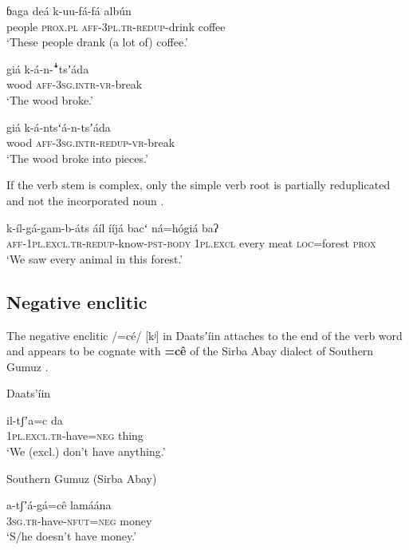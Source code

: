 \documentclass[output=paper]{langsci/langscibook}
\begin{document}
\ea\label{ex:ahlandc:37}
\gll
ɓaga  deá  k-uu-fá-fá   alb\'{u}n   \\
people  \textsc{prox.pl}  \textsc{aff-3pl.tr-redup}{}-drink   coffee \\
\glt
‘These people drank (a lot of) coffee.’ 
\z

\ea\label{ex:ahlandc:38}
\gll
giá     k-á-n-\textsf{ꜜ}tsʼáda \\
wood \textsc{aff-3sg.intr}{}-\textsc{vr-}break \\
\glt
‘The wood broke.’
\z

\ea\label{ex:ahlandc:39}
\gll
giá       k-á-ntsʻá-n-tsʼáda  \\
wood  \textsc{aff-3sg.intr}{}-\textsc{redup}{}-\textsc{vr}{}-break \\
\glt
 ‘The wood broke into pieces.’
\z

If the verb stem is complex, only the simple verb root is partially reduplicated and not the incorporated noun . 

\ea\label{ex:ahlandc:40}
\gll
k-íl-gá-gam-b-áts                                        áíl           ííjá      bacʻ   ná=h\'{o}giá  baʔ \\
\textsc{aff-1pl.excl.tr-redup}{}-know-\textsc{pst-body} \textsc{1pl.excl} every  meat  \textsc{loc}=forest \textsc{prox} \\
\glt
‘We saw every animal in this forest.’
\z


\subsection{Negative enclitic}\label{sec:ahlandc:4.8}

The negative enclitic /=cé/ [kʲ] in Daatsʼíin  attaches to the end of the verb word and appears to be cognate with \textbf{=c\^{e}} of the Sirba Abay dialect of Southern Gumuz  \citep[cf.][241-242]{Ahland2012}. 

\ea\label{ex:ahlandc:41}
Daats’íin

\gll
il-tʃʼa=c   da \\
\textsc{  1pl.excl.tr}{}-have=\textsc{neg}     thing \\
\glt
  ‘We (excl.) don’t have anything.’
\z

\ea\label{ex:ahlandc:42}
Southern Gumuz (Sirba Abay)

\gll
  a-tʃʼá-gá=c\^{e}                      lamáána \\
\textsc{  3sg.tr}{}-have-\textsc{nfut=neg  } money \\
\glt
  ‘S/he doesn’t have money.’
\z
\end{document}
